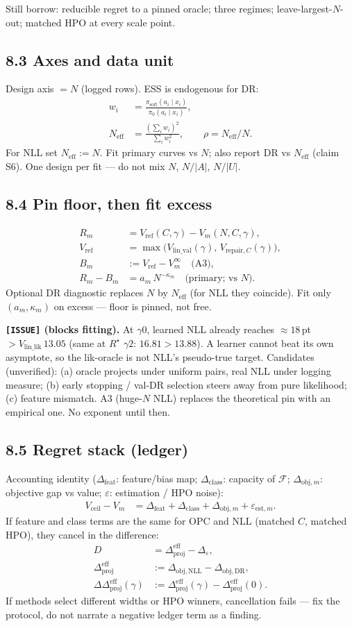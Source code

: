 \documentclass[11pt]{article}
\newcommand{\phonesub}[1]{\Needspace{6\baselineskip}\subsection*{#1}}
\newcommand{\stag}[1]{\texttt{[#1]}}
\newcommand{\Rstar}{R^{\star}}
\newcommand{\Dprojeff}{\Delta_{\mathrm{proj}}^{\mathrm{eff}}}
\newcommand{\DDprojeff}{\Delta\Delta_{\mathrm{proj}}^{\mathrm{eff}}}
\newcommand{\Neff}{N_{\mathrm{eff}}}
\begin{document}
Still borrow: reducible regret to a pinned
oracle; three regimes; leave-largest-$N$-out;
matched HPO at every scale point.

\phonesub{8.3 Axes and data unit}
Design axis $=N$ (logged rows).  ESS is
endogenous for DR:
\begin{align*}
w_{i}
  &= \frac{\pi_{\mathrm{soft}}(a_{i}\mid x_{i})}
         {\pi_{0}(a_{i}\mid x_{i})},\\
\Neff
  &= \frac{(\sum_{i} w_{i})^{2}}
         {\sum_{i} w_{i}^{2}},\qquad
\rho=\Neff/N.
\end{align*}
For NLL set $\Neff:=N$.  Fit primary curves
vs $N$; also report DR vs $\Neff$ (claim S6).
One design per fit --- do not mix
$N$, $N/|A|$, $N/|U|$.

\phonesub{8.4 Pin floor, then fit excess}
\begin{align*}
R_{m}
  &= V_{\mathrm{ref}}(C,\gamma)
   - V_{m}(N,C,\gamma),\\
V_{\mathrm{ref}}
  &= \max\!\big(
       V_{\mathrm{lin\_val}}(\gamma),\,
       V_{\mathrm{repair},C}(\gamma)
     \big),\\
B_{m}
  &:= V_{\mathrm{ref}}-V_{m}^{\infty}
  \quad\text{(A3)},\\
R_{m}-B_{m}
  &= a_{m}\,N^{-\kappa_{m}}
  \quad\text{(primary; vs $N$)}.
\end{align*}
Optional DR diagnostic replaces $N$ by
$\Neff$ (for NLL they coincide).  Fit only
$(a_{m},\kappa_{m})$ on excess --- floor is
pinned, not free.

\textbf{\stag{ISSUE} (blocks fitting).}
At $\gamma0$, learned NLL already reaches
$\approx 18$\,pt $> V_{\mathrm{lin\_lik}}\,13.05$
(same at $\Rstar$ $\gamma2$: $16.81>13.88$).
A learner cannot beat its own asymptote, so
the lik-oracle is not NLL's pseudo-true
target.  Candidates (unverified): (a) oracle
projects under uniform pairs, real NLL under
logging measure; (b) early stopping /
val-DR selection steers away from pure
likelihood; (c) feature mismatch.  A3
(huge-$N$ NLL) replaces the theoretical pin
with an empirical one.  No exponent until
then.

\phonesub{8.5 Regret stack (ledger)}
Accounting identity
($\Delta_{\mathrm{feat}}$: feature/bias map;
$\Delta_{\mathrm{class}}$: capacity of
$\mathcal{F}$; $\Delta_{\mathrm{obj},m}$:
objective gap vs value; $\varepsilon$:
estimation / HPO noise):
\begin{align*}
V_{\mathrm{ceil}}-V_{m}
  &= \Delta_{\mathrm{feat}}
   + \Delta_{\mathrm{class}}
   + \Delta_{\mathrm{obj},m}
   + \varepsilon_{\mathrm{est},m}.
\end{align*}
If feature and class terms are the same for
OPC and NLL (matched $C$, matched HPO), they
cancel in the difference:
\begin{align*}
D
  &= \Dprojeff-\Delta_{\varepsilon},\\
\Dprojeff
  &:= \Delta_{\mathrm{obj},\mathrm{NLL}}
    - \Delta_{\mathrm{obj},\mathrm{DR}},\\
\DDprojeff(\gamma)
  &:= \Dprojeff(\gamma)-\Dprojeff(0).
\end{align*}
If methods select different widths or HPO
winners, cancellation fails --- fix the
protocol, do not narrate a negative ledger
term as a finding.
\end{document}
